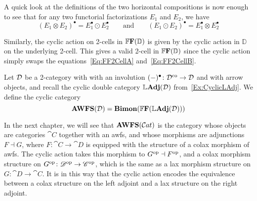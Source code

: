 A quick look at the definitions of the two horizontal compositions is now enough to see that for any two functorial factorizations $E_1$ and $E_2$, we have
\[
	(E_1\otimes E_2)^{\bullet} = E_1^{\bullet}\odot E_2^{\bullet}
	\qquad\text{and}\qquad
	(E_1\odot E_2)^{\bullet} = E_1^{\bullet}\otimes E_2^{\bullet}
\]

Similarly, the cyclic action on 2-cells in $\mathbb{F}\mathbf{F}(\mathbb{D})$ is given by the cyclic action in $\mathbb{D}$ on the underlying 2-cell. This gives a valid 2-cell in $\mathbb{F}\mathbf{F}(\mathbb{D})$ since the cyclic action simply swaps the equations~\eqref{Eq:FF2CellA} and~\eqref{Eq:FF2CellB}.

\begin{definition}
	Let $\mathcal{D}$ be a 2-category with with an involution $(-)^{\bullet}\colon\mathcal{D}^{\text{co}}\to\mathcal{D}$ and with arrow objects, and recall the cyclic double category $\mathbb{L}\mathbf{Adj}(\mathcal{D})$ from~\cref{Ex:CyclicLAdj}. We define the cyclic category
	\[
		\mathbf{AWFS}(\mathcal{D}) = \mathbf{Bimon}(\mathbb{F}\mathbf{F}(\mathbb{L}\mathbf{Adj}(\mathcal{D})))
	\]
\end{definition}

In the next chapter, we will see that $\mathbf{AWFS}(\mathcal{C}at)$ is the category whose objects are categories $\cat{C}$ together with an awfs, and whose morphisms are adjunctions $F\dashv G$, where $F\colon\cat{C}\to\cat{D}$ is equipped with the structure of a colax morphism of awfs. The cyclic action takes this morphism to ${G}^{\text{op}}\dashv{F}^{\text{op}}$, and a colax morphism structure on ${G}^{\text{op}}\colon{\mathscr{D}}^{\text{op}}\to{\mathscr{C}}^{\text{op}}$, which is the same as a lax morphism structure on $G\colon\cat{D}\to\cat{C}$. It is in this way that the cyclic action encodes the equivalence between a colax structure on the left adjoint and a lax structure on the right adjoint.
